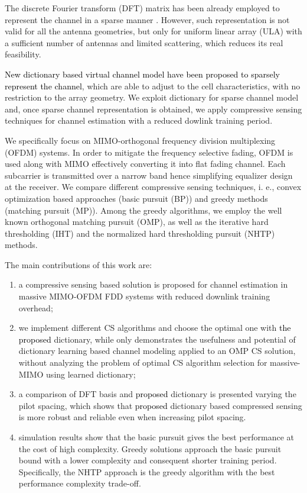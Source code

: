 The discrete Fourier transform (DFT) matrix has been already employed to
represent the channel in a sparse manner \cite{SpatSparse} \cite{SPTrans14}. However, such representation is not valid for all the antenna geometries, but only for uniform linear array (ULA) with a sufficient number of antennas and limited scattering, which reduces its real feasibility.

\textcolor{black}{New dictionary based virtual channel model have been proposed to sparsely represent the channel}, which are able to adjust to the cell characteristics, with no restriction to the array geometry. We exploit dictionary for sparse channel model and, once sparse channel representation is obtained, we apply compressive sensing techniques for channel estimation with a reduced dowlink training period.

We specifically focus on MIMO-orthogonal frequency division multiplexing (OFDM) systems. In order to mitigate the frequency selective fading, OFDM is used along with MIMO effectively converting it into flat fading channel. Each subcarrier is transmitted over a narrow band hence simplifying equalizer design at the receiver. 
We compare different compressive sensing techniques, i. e., convex optimization based approaches (basic pursuit (BP)) and greedy methods (matching pursuit (MP)). Among the greedy algorithms, we employ the well known orthogonal matching pursuit (OMP), as well as the iterative hard thresholding (IHT) and the normalized hard thresholding pursuit (NHTP) methods.

The main contributions of this work are:

\begin{enumerate}
	\item a compressive sensing based solution is proposed for channel estimation in massive MIMO-OFDM FDD systems with reduced downlink training overhead;
	\item we implement different CS algorithms and choose the optimal one with \textcolor{black}{ the proposed} dictionary, while \cite{LearningCS15} only demonstrates the usefulness and potential of dictionary learning based channel modeling applied to an OMP CS solution, without analyzing the problem of optimal CS algorithm selection for massive-MIMO using learned dictionary;
	\item a comparison of DFT basis and \textcolor{black}{proposed} dictionary is presented varying the pilot spacing, which shows that \textcolor{black}{proposed} dictionary based compressed sensing is more robust and reliable even when increasing pilot spacing. 
	\item  simulation results show that the basic pursuit gives the best performance at the cost of high complexity. Greedy solutions approach the basic pursuit bound with a lower complexity and consequent shorter training period. Specifically, the NHTP approach is the greedy algorithm with the best performance complexity trade-off.
\end{enumerate}
